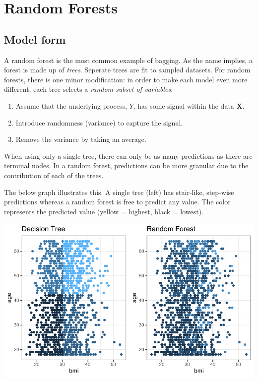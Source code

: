 \documentclass[openany]{book}
\providecommand{\tightlist}{%
  \setlength{\itemsep}{0pt}\setlength{\parskip}{0pt}}
\begin{document}
\hypertarget{random-forests}{%
\section{Random Forests}\label{random-forests}}

\hypertarget{model-form-2}{%
\subsection{Model form}\label{model-form-2}}

A random forest is the most common example of bagging. As the name implies, a forest is made up of \emph{trees}. Seperate trees are fit to sampled datasets. For random forests, there is one minor modification: in order to make each model even more different, each tree selects a \emph{random subset of variables}.

\begin{enumerate}
\def\labelenumi{\arabic{enumi}.}
\tightlist
\item
  Assume that the underlying process, \(Y\), has some signal within the data \(\mathbf{X}\).
\item
  Introduce randomness (variance) to capture the signal.
\item
  Remove the variance by taking an average.
\end{enumerate}

When using only a single tree, there can only be as many predictions as there are terminal nodes. In a random forest, predictions can be more granular due to the contribution of each of the trees.

The below graph illustrates this. A single tree (left) has stair-like, step-wise predictions whereas a random forest is free to predict any value. The color represents the predicted value (yellow = highest, black = lowest).

\includegraphics{06-tree-based-models_files/figure-latex/unnamed-chunk-11-1.pdf}
\end{document}
